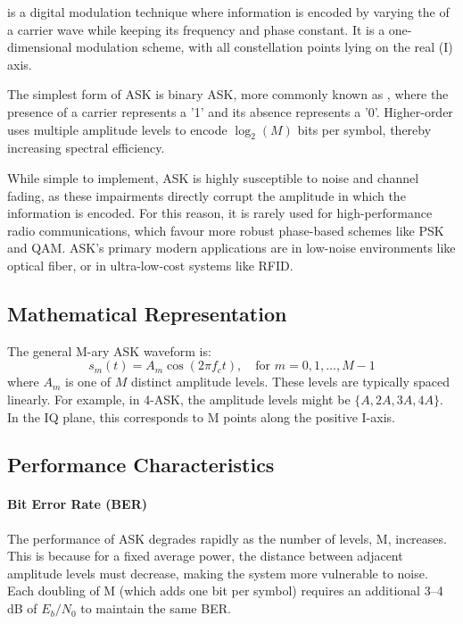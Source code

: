  is a digital modulation technique where information is encoded by varying the  of a carrier wave while keeping its frequency and phase constant. It is a one-dimensional modulation scheme, with all constellation points lying on the real (I) axis.

The simplest form of ASK is binary ASK, more commonly known as , where the presence of a carrier represents a '1' and its absence represents a '0'. Higher-order  uses multiple amplitude levels to encode $\log_2(M)$ bits per symbol, thereby increasing spectral efficiency.

\begin{keyconcept}
    While simple to implement, ASK is highly susceptible to noise and channel fading, as these impairments directly corrupt the amplitude in which the information is encoded. For this reason, it is rarely used for high-performance radio communications, which favour more robust phase-based schemes like PSK and QAM. ASK's primary modern applications are in low-noise environments like optical fiber, or in ultra-low-cost systems like RFID.
\end{keyconcept}


\subsection{Mathematical Representation}

The general M-ary ASK waveform is:
\begin{equation}
    s_m(t) = A_m \cos(2\pi f_c t), \quad \text{for } m = 0, 1, \ldots, M-1
\end{equation}
where $A_m$ is one of $M$ distinct amplitude levels. These levels are typically spaced linearly. For example, in 4-ASK, the amplitude levels might be $\{A, 2A, 3A, 4A\}$. In the IQ plane, this corresponds to M points along the positive I-axis.


\subsection{Performance Characteristics}

\paragraph{Bit Error Rate (BER)}
The performance of ASK degrades rapidly as the number of levels, M, increases. This is because for a fixed average power, the distance between adjacent amplitude levels must decrease, making the system more vulnerable to noise. Each doubling of M (which adds one bit per symbol) requires an additional 3--4 dB of $E_b/N_0$ to maintain the same BER.

